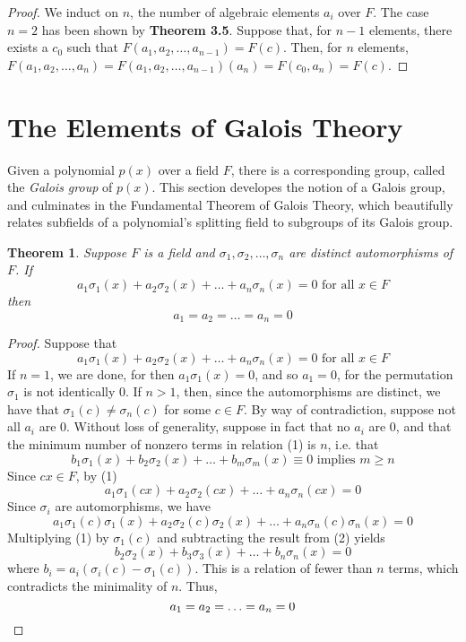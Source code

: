 \documentclass[12pt,leqno]{article}
\numberwithin{equation}{section}
\theoremstyle{plain}
\newtheorem{thm}{Theorem}[section]
\theoremstyle{definition}
\theoremstyle{remark}
\begin{document}
\begin{proof}
 We induct on $n$, the number of algebraic elements $a_i$ over $F$. The case $n=2$ has been shown by \textbf{Theorem 3.5}. Suppose that, for $n-1$ elements, there exists a $c_0$ such that $F(a_1,a_2,\hdots,a_{n-1})=F(c)$. Then, for $n$ elements, $F(a_1,a_2,\hdots,a_n)=F(a_1,a_2,\hdots,a_{n-1})(a_n)=F(c_0,a_n)=F(c)$.
\end{proof}

\section{The Elements of Galois Theory}
Given a polynomial $p(x)$ over a field $F$, there is a corresponding group, called the \textit{Galois group} of $p(x)$. This section developes the notion of a Galois group, and culminates in the Fundamental Theorem of Galois Theory, which beautifully relates subfields of a polynomial's splitting field to subgroups of its Galois group. 

\begin{thm}
 Suppose $F$ is a field and $\sigma_1,\sigma_2,\hdots,\sigma_n$ are distinct automorphisms of $F$. If \[a_1\sigma_1(x)+a_2\sigma_2(x)+\hdots+a_n\sigma_n(x)=0\text{ for all }x\in F\] then \[a_1=a_2=\hdots=a_n=0\]
\end{thm}

\begin{proof}
Suppose that \[\tag{1}a_1\sigma_1(x)+a_2\sigma_2(x)+\hdots+a_n\sigma_n(x)=0\text{ for all }x\in F\] If $n=1$, we are done, for then $a_1\sigma_1(x)=0$, and so $a_1=0$, for the permutation $\sigma_1$ is not identically 0. If $n>1$, then, since the automorphisms are distinct, we have that $\sigma_1(c)\not=\sigma_n(c)$ for some $c\in F$. By way of contradiction, suppose not all $a_i$ are 0. Without loss of generality, suppose in fact that no $a_i$ are 0, and that the minimum number of nonzero terms in relation (1) is $n$, i.e. that \[b_1\sigma_1(x)+b_2\sigma_2(x)+\hdots+b_m\sigma_m(x)\equiv0\text{ implies }m\geq n\] Since $cx\in F$, by (1) \[a_1\sigma_1(cx)+a_2\sigma_2(cx)+\hdots+a_n\sigma_n(cx)=0\] Since $\sigma_i$ are automorphisms, we have \[\tag{2} a_1\sigma_1(c)\sigma_1(x)+a_2\sigma_2(c)\sigma_2(x)+\hdots+a_n\sigma_n(c)\sigma_n(x)=0\] Multiplying (1) by $\sigma_1(c)$ and subtracting the result from (2) yields \[b_2\sigma_2(x)+b_3\sigma_3(x)+\hdots+b_n\sigma_n(x)=0\] where $b_i=a_i(\sigma_i(c)-\sigma_1(c))$. This is a relation of fewer than $n$ terms, which contradicts the minimality of $n$. Thus, \[a_1=a_2=\hdots=a_n=0\qedhere\]
\end{proof}
\end{document}
